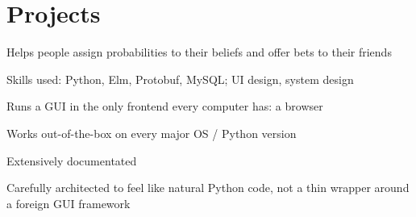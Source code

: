 \section{Projects}

\begin{tightemize}
\item Helps people assign probabilities to their beliefs and offer bets to their friends
\item Skills used: Python, Elm, Protobuf, MySQL; UI design, system design
\end{tightemize}
\sectionsep

\begin{tightemize}
\item Runs a GUI in the only frontend every computer has: a browser
\item Works out-of-the-box on every major OS / Python version
\item Extensively documentated
\item Carefully architected to feel like natural Python code, not a thin wrapper around a foreign GUI framework
\end{tightemize}
\sectionsep

%

